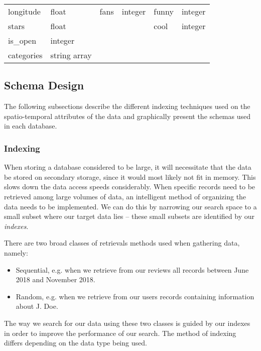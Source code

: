 \begin{table*}[h]
\begin{tabular}{ |p{2cm}|p{2cm}||p{2cm}|p{2cm}||p{2cm}|p{2cm}|}
        longitude                       & float                       &  fans           & integer      & funny        & integer   \\
        stars                           & float                       &                 &              & cool         & integer   \\
        is\_open                        & integer                     &                 &              &              &           \\
        categories                      & string array                &                 &              &              &           \\
        \hline
    \end{tabular}
    \label{tab:yelp-data}
\end{table*}

\subsection{Schema Design}

The following subsections describe the different indexing techniques used on the spatio-temporal attributes of the data and graphically present the schemas used in each database.

\subsubsection{Indexing}
When storing a database considered to be large, it will necessitate that the data be stored on secondary storage, since it would most likely not fit in memory. This slows down the data access speeds considerably. When specific records need to be retrieved among large volumes of data, an intelligent method of organizing the data needs to be implemented. We can do this by narrowing our search space to a small subset where our target data lies -- these small subsets are identified by our \emph{indexes}.

There are two broad classes \cite{btree} of retrievals methods used when gathering data, namely:
\begin{itemize}
    \item Sequential, e.g. when we retrieve from our reviews all records between June 2018 and November 2018.
    \item Random, e.g. when we retrieve from our users records containing information about J. Doe.
\end{itemize}
The way we search for our data using these two classes is guided by our indexes in order to improve the performance of our search. The method of indexing differs depending on the data type being used.

